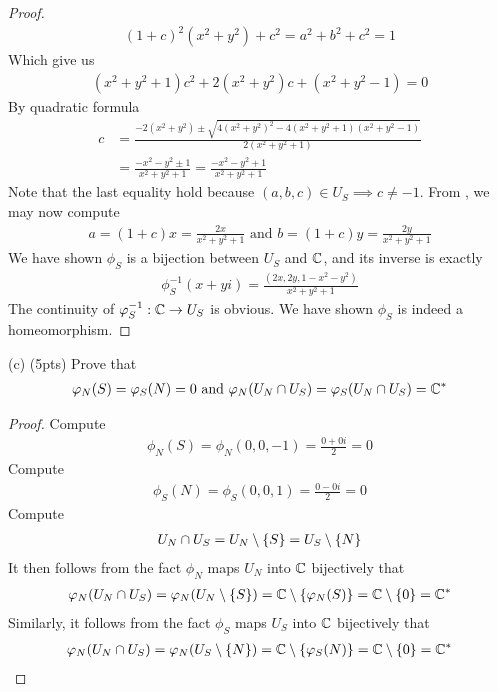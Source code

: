\documentclass{report}
\begin{document}
\begin{proof}
\begin{align*}
  (1+c)^2(x^2+y^2)+c^2= a^2+ b^2 +c^2 =1
\end{align*}
Which give us 
\begin{align*}
  (x^2+y^2+1)c^2 + 2(x^2+y^2)c + (x^2+y^2-1)=0
\end{align*}
By quadratic formula 
\begin{align*}
c&= \frac{-2(x^2+y^2)\pm \sqrt{4(x^2+y^2)^2 -4(x^2+y^2+1)(x^2+y^2-1)} }{2(x^2+y^2+1)} \\
&= \frac{-x^2-y^2\pm 1}{x^2+y^2+1}= \frac{-x^2-y^2+1}{x^2+y^2+1}
\end{align*}
Note that the last equality hold because $(a,b,c) \in U_S \implies c\neq -1$. From , we may now compute 
\begin{align*}
a=(1+c)x= \frac{2x}{x^2+y^2+1}\text{ and }b=(1+c)y= \frac{2y}{x^2+y^2+1}
\end{align*}
We have shown $\phi_S$ is a bijection between $U_S$ and  $\mathbb{C}$, and its inverse is exactly 
 \begin{align*}
\phi_S^{-1}(x+yi)= \frac{(2x,2y,1-x^2-y^2)}{x^2+y^2+1}
\end{align*}
The continuity of $\varphi_S^{-1}:\mathbb{C} \rightarrow U_S$ is obvious. We have shown $\phi_S$ is indeed a homeomorphism. 
\end{proof}
\begin{question}{}{}
  (c) (5pts) Prove that 
\begin{align*}
\varphi_N (S)=\varphi_S(N)=0 \text{ and }\varphi_N (U_N \cap U_S)= \varphi_S (U_N \cap U_S)=\mathbb{C}^*
\end{align*}
\end{question}
\begin{proof}
Compute 
\begin{align*}
\phi_N (S)= \phi_N (0,0,-1)= \frac{0+0i}{2}=0
\end{align*}
Compute 
\begin{align*}
\phi_S(N)= \phi_S(0,0,1)= \frac{0-0i}{2}= 0
\end{align*}
Compute 
\begin{align*}
U_N \cap  U_S = U_N \setminus \{ S \} = U_S \setminus \{ N \}
\end{align*}
It then follows from the fact $\phi_N$ maps $U_N$ into  $\mathbb{C}$ bijectively that 
\begin{align*}
\varphi_N (U_N \cap U_S)= \varphi_N (U_N \setminus \{ S \})= \mathbb{C} \setminus \{ \varphi_N (S) \}=\mathbb{C} \setminus \{ 0 \}=\mathbb{C}^*
\end{align*}
 Similarly, it follows from the fact $\phi_S$ maps $U_S$ into  $\mathbb{C}$ bijectively that 
\begin{align*}
\varphi_N (U_N \cap U_S)= \varphi_N (U_S \setminus \{ N \})= \mathbb{C} \setminus \{ \varphi_S (N) \}=\mathbb{C} \setminus \{ 0 \}=\mathbb{C}^*
\end{align*}
\end{proof}
\end{document}

